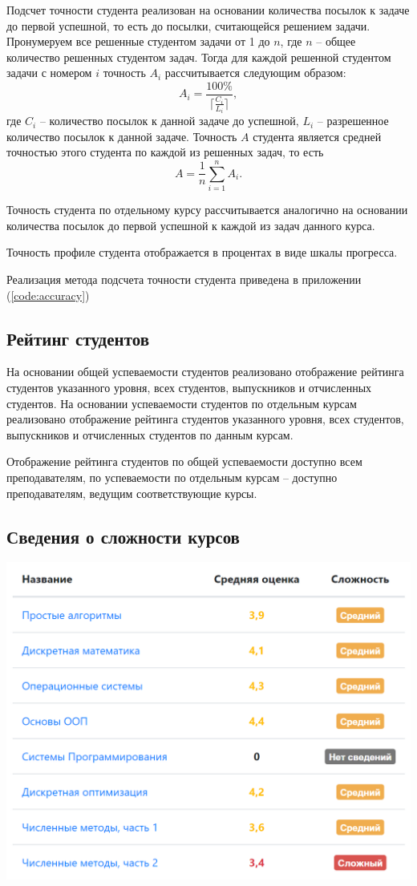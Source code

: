 \documentclass[12pt, a4paper, oneside]{article}
\begin{document}
Подсчет точности студента реализован на основании количества посылок к задаче до первой успешной, то есть до посылки, считающейся решением задачи. Пронумеруем все решенные студентом задачи от 1 до $n$, где $n$ – общее количество решенных студентом задач. Тогда для каждой решенной студентом задачи с номером $i$ точность $A_i$ рассчитывается следующим образом: 
$$A_i=\frac{100\%}{\lceil \frac{C_i}{L_i}\rceil},$$
где $C_i$ – количество посылок к данной задаче до успешной, $L_i$ – разрешенное количество посылок к данной задаче. Точность $A$ студента является средней точностью этого студента по каждой из решенных задач, то есть
$$A=\frac{1}{n}\sum_{i=1}^{n}A_i.$$

Точность студента по отдельному курсу рассчитывается аналогично на основании количества посылок до первой успешной к каждой из задач данного курса.

Точность профиле студента отображается в процентах в виде шкалы прогресса.

Реализация метода подсчета точности студента приведена в приложении (\ref{code:accuracy})
\subsection{Рейтинг студентов}
На основании общей успеваемости студентов реализовано отображение рейтинга студентов указанного уровня, всех студентов, выпускников и отчисленных студентов. На основании успеваемости студентов по отдельным курсам реализовано отображение рейтинга студентов указанного уровня, всех студентов, выпускников и отчисленных студентов по данным курсам.

Отображение рейтинга студентов по общей успеваемости доступно всем преподавателям, по успеваемости по отдельным курсам – доступно преподавателям, ведущим соответствующие курсы.
\subsection{Сведения о сложности курсов}
\begin{center}
    \includegraphics[scale=0.45]{course-difficulty}
\end{center}
\end{document}
